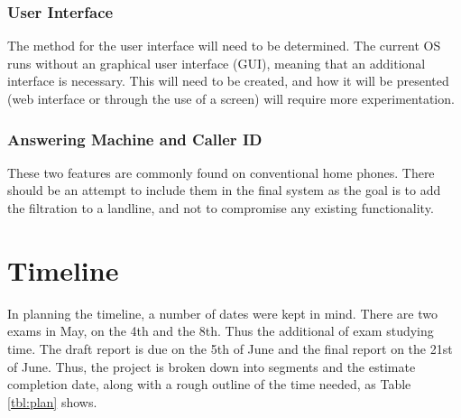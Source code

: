 \documentclass[main.tex]{subfiles}
\begin{document}
\subsubsection{User Interface}
The method for the user interface will need to be determined. The current OS runs without an graphical user interface (GUI), meaning that an additional interface is necessary. This will need to be created, and how it will be presented (web interface or through the use of a screen) will require more experimentation.

\subsubsection{Answering Machine and Caller ID}
These two features are commonly found on conventional home phones. There should be an attempt to include them in the final system as the goal is to add the filtration to a landline, and not to compromise any existing functionality.

\section{Timeline}
In planning the timeline, a number of dates were kept in mind. There are two exams in May, on the 4th and the 8th. Thus the additional of exam studying time. The draft report is due on the 5th of June and the final report on the 21st of June. Thus, the project is broken down into segments and the estimate completion date, along with a rough outline of the time needed, as Table \ref{tbl:plan} shows.
\end{document}
